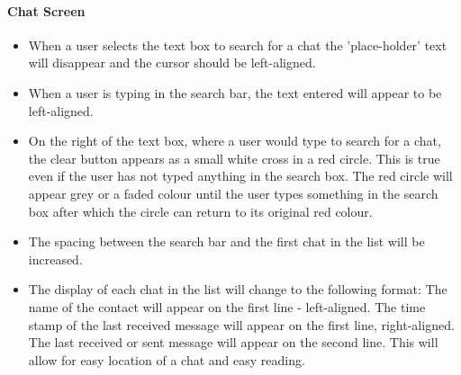 \documentclass[11pt]{article}
\begin{document}
\paragraph{Chat Screen}
\begin{itemize}
\item	When a user selects the text box to search for a chat the 'place-holder' text will disappear and the cursor should be left-aligned.

\item When a user is typing in the search bar, the text entered will appear to be left-aligned.

\item On the right of the text box, where a user would type to search for a chat, the clear button appears as a small white cross in a red circle. This is true even if the user has not typed anything in the search box. The red circle will appear grey or a faded colour until the user types something in the search box after which the circle can return to its original red colour. 

\item The spacing between the search bar and the first chat in the list will be increased.

\item The display of each chat in the list will change to the following format:
\subitem The name of the contact will appear on the first line - left-aligned.
\subitem The time stamp of the last received message will appear on the first line, right-aligned.
\subitem The last received or sent message will appear on the second line. This will allow for easy location of a chat and easy reading.
\end{itemize}
\end{document}
